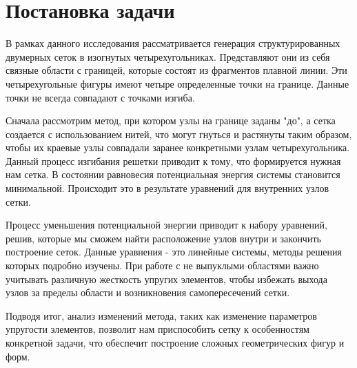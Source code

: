 \documentclass[a4paper,14pt,russian]{extreport}
\renewcommand{\_}{\kern-1.5pt\textunderscore\kern-1.5pt}
\begin{document}
	
\section{Постановка задачи}
\par В рамках данного исследования рассматривается генерация структурированных двумерных сеток в изогнутых четырехугольниках. Представляют они из себя связные области с границей, которые состоят из фрагментов плавной линии. Эти четырехугольные фигуры имеют четыре определенные точки на границе. Данные точки не всегда совпадают с точками изгиба.

\par Сначала рассмотрим метод, при котором узлы на границе заданы "до", а сетка создается с использованием нитей, что могут гнуться и растянуты таким образом, чтобы их краевые узлы совпадали заранее конкретными узлам четырехугольника. Данный процесс изгибания решетки приводит к тому, что формируется нужная нам сетка. В состоянии равновесия потенциальная энергия системы становится минимальной. Происходит это в результате уравнений для внутренних узлов сетки.


\par Процесс уменьшения потенциальной энергии приводит к набору уравнений, решив, которые мы сможем найти расположение узлов внутри и закончить построение сеток. Данные уравнения - это линейные системы, методы решения которых подробно изучены. При работе с не выпуклыми областями важно учитывать различную жесткость упругих элементов, чтобы избежать выхода узлов за пределы области и возникновения самопересечений сетки.

\par Подводя итог, анализ изменений метода, таких как изменение параметров упругости элементов, позволит нам приспособить сетку к особенностям конкретной задачи, что обеспечит построение сложных геометрических фигур и форм.
\end{document}
